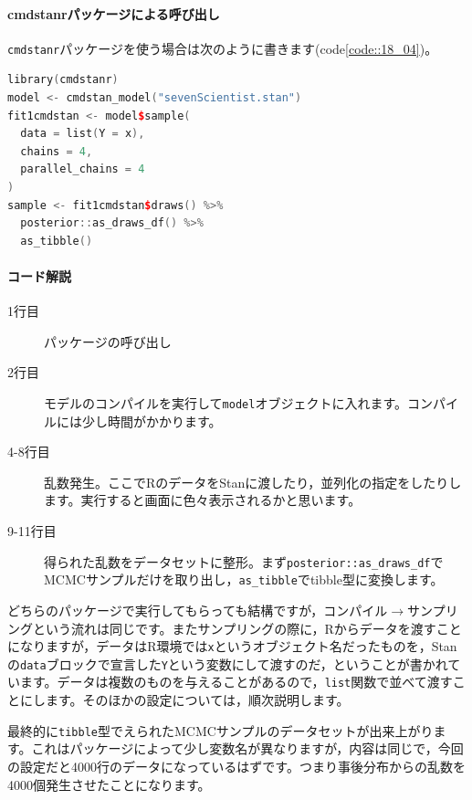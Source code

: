 \documentclass{ltjsbook}
\begin{document}
\paragraph{cmdstanrパッケージによる呼び出し}

\texttt{cmdstanr}パッケージを使う場合は次のように書きます(code\ref{code::18_04})。

\begin{lstlisting}[language=C++,label={code::18_04},caption={cmdstanrパッケージによる呼び出し}]
library(cmdstanr)
model <- cmdstan_model("sevenScientist.stan")
fit1cmdstan <- model$sample(
  data = list(Y = x),
  chains = 4,
  parallel_chains = 4
)
sample <- fit1cmdstan$draws() %>% 
  posterior::as_draws_df() %>% 
  as_tibble()
\end{lstlisting}
\paragraph{コード解説}
\begin{description}
    \item[1行目] パッケージの呼び出し
    \item[2行目] モデルのコンパイルを実行して\texttt{model}オブジェクトに入れます。コンパイルには少し時間がかかります。
    \item[4-8行目] 乱数発生。ここでRのデータをStanに渡したり，並列化の指定をしたりします。実行すると画面に色々表示されるかと思います。
    \item[9-11行目] 得られた乱数をデータセットに整形。まず\verb|posterior::as_draws_df|でMCMCサンプルだけを取り出し，\verb|as_tibble|でtibble型に変換します。
\end{description}

どちらのパッケージで実行してもらっても結構ですが，コンパイル$\to$サンプリングという流れは同じです。またサンプリングの際に，Rからデータを渡すことになりますが，データはR環境では\texttt{x}というオブジェクト名だったものを，Stanの\texttt{data}ブロックで宣言した\texttt{Y}という変数にして渡すのだ，ということが書かれています。データは複数のものを与えることがあるので，\texttt{list}関数で並べて渡すことにします。そのほかの設定については，順次説明します。

最終的に\verb|tibble|型でえられたMCMCサンプルのデータセットが出来上がります。これはパッケージによって少し変数名が異なりますが，内容は同じで，今回の設定だと4000行のデータになっているはずです。つまり事後分布からの乱数を4000個発生させたことになります。
\end{document}
